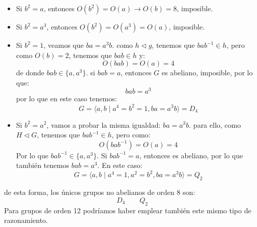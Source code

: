 \begin{itemize}
    \item Si $b^2 = a$, entonces $O(b^2) = O(a) \longrightarrow O(b) = 8$, imposible.
    \item Si $b^2 = a^3$, entonces $O(b^2) = O(a^3) = O(a)$, imposible.
    \item Si $b^2 = 1$, veamos que $ba = a^3b$. como $h\lhd g$, tenemos que $bab^{-1}\in h$, pero como $O(b) = 2$, tenemos que $bab\in h$ y:
        \begin{equation*}
            O(bab) = O(a) = 4
        \end{equation*}
        de donde $bab \in \{a,a^3\}$. si $bab = a$, entonces $G$ es abeliano, imposible, por lo que:
        \begin{equation*}
            bab = a^3
        \end{equation*}
        por lo que en este caso tenemos:
        \begin{equation*}
            G = \langle a,b \mid a^4 = b^2 = 1, ba=a^3b \rangle = D_4
        \end{equation*}
    \item Si $b^2 = a^2$, vamos a probar la misma igualdad: $ba=a^3b$. para ello, como $H\lhd G$, tenemos que $bab^{-1}\in h$, pero como:
        \begin{equation*}
            O(bab^{-1}) = O(a) = 4
        \end{equation*}
        Por lo que $bab^{-1}\in \{a,a^3\}$. Si $bab^{-1}=a$, entonces es abeliano, por lo que también tenemos $bab=a^3$. En este caso:
        \begin{equation*}
            G = \langle a,b\mid a^4 = 1, a^2 = b^2, ba = a^3b \rangle = Q_2
        \end{equation*}
\end{itemize}
de esta forma, los únicos grupos no abelianos de orden 8 son:
\begin{equation*}
    D_4 \qquad Q_2
\end{equation*}
Para grupos de orden 12 podríamos haber emplear también este mismo tipo de razonamiento.

